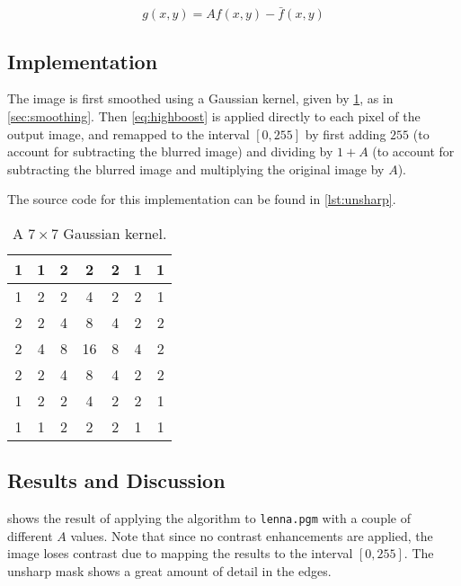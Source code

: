 \documentclass[headings=optiontoheadandtoc,listof=totoc,parskip=full]{scrartcl}
\begin{document}
\begin{equation}
	g(x,y) = Af(x,y) - \bar{f}(x,y)
	\label{eq:highboost}
\end{equation}

\subsection{Implementation}
The image is first smoothed using a Gaussian kernel, given by \cref{tab:gaussian-7}, as in \cref{sec:smoothing}. Then \cref{eq:highboost} is applied directly to each pixel of the output image, and remapped to the interval $[0, 255]$ by first adding $255$ (to account for subtracting the blurred image) and dividing by $1 + A$ (to account for subtracting the blurred image and multiplying the original image by $A$).

The source code for this implementation can be found in \cref{lst:unsharp}.

\begin{table}[H]
	\centering
	\begin{tabular}{|c|c|c|c|c|c|c|}
		\hline
		1 & 1 & 2 &  2 & 2 & 1 & 1 \\\hline
        1 & 2 & 2 &  4 & 2 & 2 & 1 \\\hline
        2 & 2 & 4 &  8 & 4 & 2 & 2 \\\hline
        2 & 4 & 8 & 16 & 8 & 4 & 2 \\\hline
        2 & 2 & 4 &  8 & 4 & 2 & 2 \\\hline
        1 & 2 & 2 &  4 & 2 & 2 & 1 \\\hline
        1 & 1 & 2 &  2 & 2 & 1 & 1 \\\hline
	\end{tabular}
	\caption{A $7 \times 7$ Gaussian kernel.}
	\label{tab:gaussian-7}
\end{table}

\subsection{Results and Discussion}
\label{sec:unsharp-results}

 shows the result of applying the algorithm to \texttt{lenna.pgm} with a couple of different $A$ values. Note that since no contrast enhancements are applied, the image loses contrast due to mapping the results to the interval $[0,255]$. The unsharp mask shows a great amount of detail in the edges.
\end{document}
